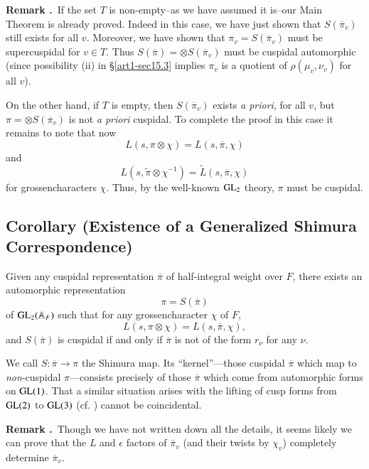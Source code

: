 \medskip
\noindent
{\bf Remark .\label{art1-rem15.5}}~If the set $T$ is non-empty--as we have assumed it is--our Main Theorem is already proved. Indeed in this case, we have just shown that $S(\overline{\pi}_{v})$ still exists for all $v$. Moreover, we have shown that $\pi_{v}=S(\overline{\pi}_{v})$ must be supercuspidal for $v\in T$. Thus $S(\overline{\pi})=\otimes S(\overline{\pi}_{v})$ must be cuspidal automorphic (since possibility (ii) in \S\ref{art1-sec15.3} implies $\pi_{v}$ is a quotient of $\rho(\mu_{v},\nu_{v})$ for all $v$).

On the other hand, if $T$ is empty, then $S(\overline{\pi}_{v})$ exists {\em a priori}, for all $v$, but $\pi=\otimes S(\overline{\pi}_{v})$ is not {\em a priori} cuspidal. To complete the proof in this case it remains to note that now
$$
L(s,\pi\otimes \chi)=L(s,\overline{\pi},\chi)
$$
and
$$
L(s,\widetilde{\pi}\otimes \chi^{-1})=\widetilde{L}(s,\overline{\pi},\chi)
$$
for grossencharacters $\chi$. Thus, by the well-known $\mathrm{GL}_{2}$ theory, $\pi$ must be cuspidal.

\setcounter{subsection}{5}
\subsection{Corollary (Existence of a Generalized Shimura Correspon\-dence)}\label{art1-sec15.6}

Given any cuspidal representation $\overline{\pi}$ of half-integral weight over $F$, there exists an automorphic representation
$$
\pi=S(\overline{\pi})
$$
of $\mathrm{GL}_{2}(\mathbb{A}_{F})$ such that for any grossencharacter $\chi$ of $F$,
$$
L(s,\pi\otimes \chi)=L(s,\overline{\pi},\chi),
$$
and $S(\overline{\pi})$ is cuspidal if and only if $\overline{\pi}$ is not of the form $r_{\nu}$ for any $\nu$.

We call $S:\overline{\pi}\to \pi$ the Shimura map. Its ``kernel''---those cuspidal $\overline{\pi}$ which map to {\em non}-cuspidal $\pi$---consists precisely of those $\overline{\pi}$ which come from automorphic forms on $\mathrm{GL}(1)$. That a similar situation arises with the lifting of cusp forms from $\mathrm{GL}(2)$ to $\mathrm{GL}(3)$ (cf. \cite{GeJa}) cannot be coincidental.

\medskip
\noindent
{\bf Remark .\label{art1-rem15.7}}~Though we have not written down all the details, it seems likely we can prove that the $L$ and $\epsilon$ factors of $\overline{\pi}_{v}$ (and their twists by $\chi_{v}$) completely determine $\overline{\pi}_{v}$.

